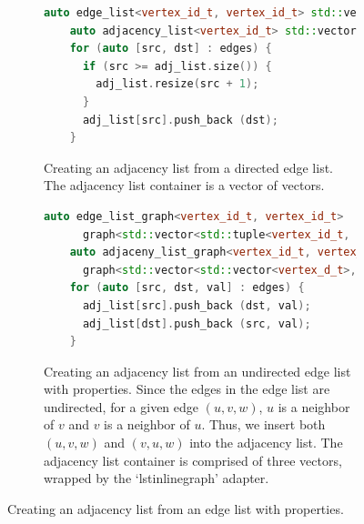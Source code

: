 \begin{figure}[ht]
  \begin{center}
    \begin{subfigure}{0.48\textwidth}
      \begin{lstlisting}[language=C++]
    auto edge_list<vertex_id_t, vertex_id_t> std::vector<std::tuple<vertex_id_t, vertex_id_t> edges;
    auto adjacency_list<vertex_id_t> std::vector<std::vector<vertex_d_t>> adj_list;
    for (auto [src, dst] : edges) {
      if (src >= adj_list.size()) {
        adj_list.resize(src + 1);
      }
      adj_list[src].push_back (dst);
    }
      \end{lstlisting}
      \caption{Creating an adjacency list from a directed edge list.
      The adjacency list container is a vector of vectors.
      \label{subfig:adj_list_from_directed_edge_list}}
    \end{subfigure}
    \begin{subfigure}{0.48\textwidth}
      \begin{lstlisting}[language=C++]
    auto edge_list_graph<vertex_id_t, vertex_id_t>
      graph<std::vector<std::tuple<vertex_id_t, vertex_id_t>> edges;
    auto adjaceny_list_graph<vertex_id_t, vertex_id_t, double>
      graph<std::vector<std::vector<vertex_d_t>, std::vector<double>> adj_list{edges.num_vertices()};
    for (auto [src, dst, val] : edges) {
      adj_list[src].push_back (dst, val);
      adj_list[dst].push_back (src, val);
    }
      \end{lstlisting}
      \caption{Creating an adjacency list from an undirected edge list with properties.
      Since the edges in the edge list are undirected, for a given edge $(u, v, w)$,
        $u$ is a neighbor of $v$ and $v$ is a neighbor of $u$. Thus, we insert both
        $(u, v, w)$ and $(v, u, w)$ into the adjacency list.
        The adjacency list container is comprised of three vectors, wrapped by
        the `lstinline{graph}' adapter.
        \label{subfig:adj_list_from_undirected_edge_list}}
    \end{subfigure}
    \caption{Creating an adjacency list from an edge list with properties.\label{fig:adj_list_from_edge_list}}
  \end{center}
\end{figure}



